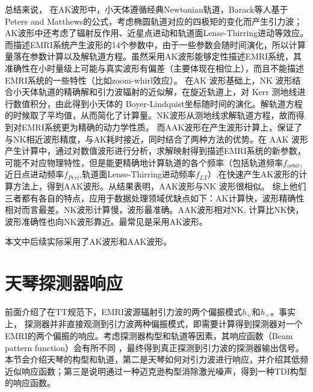 总结来说，
在AK波形中，小天体遵循经典Newtonian轨道，Barack等人基于Peters and Matthews的公式，考虑椭圆轨道对应的四极矩的变化而产生引力波；AK波形中还考虑了辐射反作用、近星点进动和轨道面Lense-Thirring进动等效应。而描述EMRI系统产生波形的14个参数中，由于一些参数会随时间演化，所以计算量落在参数计算以及解轨道方程。虽然采用AK波形能够定性描述EMRI系统，其准确性在小时量级上可能与真实波形有偏差（主要体现在相位上），而且不能描述EMRI系统的一些特性（比如zoom-whirl效应）。
在AK 波形基础上，NK 波形结合小天体轨道的精确解和引力波辐射的近似解，在旋近轨道上，对 Kerr 测地线进行数值积分，由此得到小天体的 Boyer-Lindquist坐标随时间的演化。解轨道方程的时候取了平均值，从而简化了计算量。NK波形从测地线求解轨道方程，故而得到对EMRI系统更为精确的动力学性质。
而AAK波形在产生波形计算上，保证了与NK相近波形精度，与AK耗时接近，同时结合了两种方法的优势。在 AAK 波形产生计算中，通过对数值波形进行分析，求解映射得到描述EMRI系统的新参数，可能不对应物理特性，但是能更精确地计算轨道的各个频率（包括轨道频率$f_{orbit}$,近日点进动频率$f_{Peri}$,轨道面Lense-Thirring进动频率$f_{LT}$）,在快速产生AK波形的计算方法上，得到AAK波形。从结果表明，AAK波形与NK 波形很相似。
综上他们三者都有各自的特点，应用于数据处理领域优缺点如下：AK计算快，波形精确性相对而言最差。NK波形计算慢，波形最准确。AAK波形相对NK, 计算比NK快，波形准确性也向NK波形靠近。最常见是采用AK波形。

本文中后续实际采用了AK波形和AAK波形。


\section{天琴探测器响应}
前面介绍了在TT规范下，EMRI波源辐射引力波的两个偏振模式$h_{+}$和$h_{\times}$。事实上，
探测器并非直接观测到引力波两种偏振模式，即需要计算得到探测器对一个EMRI的两个偏振的响应。考虑探测器构型和轨道等因素，其响应函数（Beam pattern function）会有所不同\cite{luo2016tianqin,cutler1998angular,cornish2003lisa,zhang2020full} %
，最终得到真正探测到引力波的探测器输出信号。本节会介绍天琴的构型和轨道，第二是天琴如何对引力波进行响应，并介绍其低频近似响应函数；第三是说明通过一种迈克逊构型消除激光噪声，得到一种TDI构型的响应函数。

